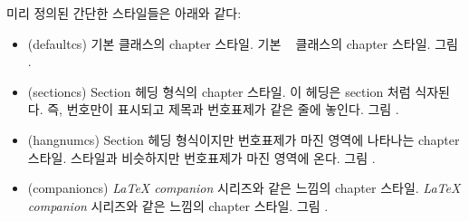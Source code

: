 미리 정의된 간단한 스타일들은 아래와 같다:
\begin{itemize}
\item[\cstyle{default}] 
\glossary(defaultcs)%
  {}%
  {기본  클래스의 chapter 스타일.}
기본 \ltx\  클래스의 chapter 스타일. 그림 .

\item[\cstyle{section}] 
\glossary(sectioncs)%
  {}%
  {Section 헤딩 형식의 chapter 스타일.}
이 헤딩은 section 처럼 식자된다.
즉, 번호만이 표시되고 제목과 번호표제가 같은 줄에 놓인다. 그림 .

\item[\cstyle{hangnum}] 
\glossary(hangnumcs)%
  {}%
  {Section 헤딩 형식이지만 번호표제가 마진 영역에 나타나는 chapter 스타일.}
 스타일과 비슷하지만 번호표제가 마진 영역에 온다. 그림 .

\item[\cstyle{companion}]
\glossary(companioncs)%
  {}%
  {\textit{LaTeX companion} 시리즈와 같은 느낌의 chapter 스타일.}
\textit{LaTeX companion} 시리즈와 같은 느낌의 chapter 스타일. 그림 .


\end{itemize}
